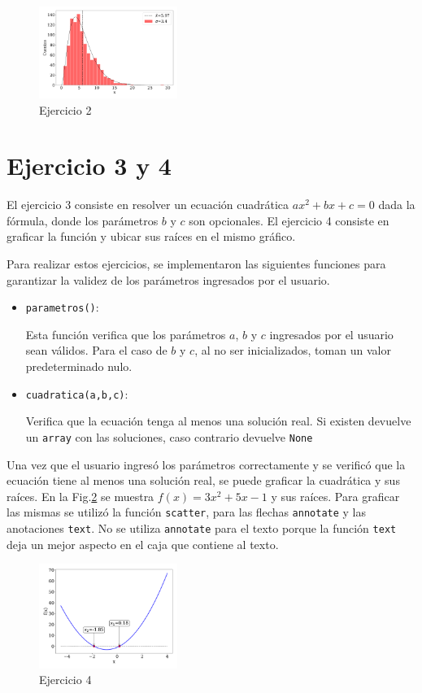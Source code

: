 \begin{figure}[H]
	\centering
	\includegraphics[width=0.4\textwidth]{ejer_2_2.pdf}
	\caption{Ejercicio 2}
	\label{fig:ejer2}
\end{figure}
	

\section*{Ejercicio 3 y 4}
 
El ejercicio 3 consiste en resolver un ecuación cuadrática $ax^2+bx+c=0$ dada la fórmula, donde los parámetros $b$ y $c$ son opcionales. El ejercicio 4 consiste en graficar la función y ubicar sus raíces en el mismo gráfico. 

Para realizar estos ejercicios, se implementaron las siguientes funciones para garantizar la validez de los parámetros ingresados por el usuario.
\begin{itemize}
	\item \verb|parametros()|:

		Esta función verifica que los parámetros $a$, $b$ y $c$ ingresados por el usuario sean válidos. Para  el caso de $b$ y $c$, al no ser inicializados, toman un valor predeterminado nulo.
	\item \verb|cuadratica(a,b,c)|:


		Verifica que la ecuación tenga al menos una solución real. Si existen devuelve un \verb|array|  con las soluciones, caso contrario devuelve \verb|None|
\end{itemize}


Una vez que el usuario ingresó los parámetros correctamente y se verificó que la ecuación tiene al menos una solución real, se puede graficar la cuadrática y sus raíces.
En la Fig.\ref{fig:ejer4} se muestra $f(x) = 3x^2+5x-1$ y sus raíces. Para graficar las mismas se utilizó la función \verb|scatter|, para las flechas \verb|annotate| y las anotaciones \verb|text|. No se utiliza \verb|annotate| para el texto porque la función \verb|text| deja un mejor aspecto en el caja que contiene al texto.

\begin{figure}[H]
	\centering
	\includegraphics[width=0.4\textwidth]{ejer_4.pdf}
	\caption{Ejercicio 4}
	\label{fig:ejer4}
\end{figure}
	

